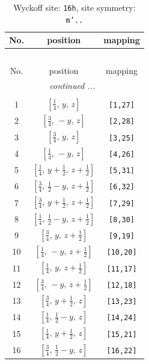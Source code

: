 \documentclass[fleqn,8pt]{jsarticle}
\begin{document}
\renewcommand{\arraystretch}{1.2}
\begin{longtable}{ccc}
\caption{Wyckoff site: {\tt 16h}, site symmetry: {\tt m'..}}
 \\
 \hline \hline
No. & position & mapping \\ \hline \endfirsthead

\multicolumn{2}{l}{\tablename\ \thetable{}} \\
 \hline \hline
No. & position & mapping \\ \hline \endhead

 \hline \hline
\multicolumn{2}{r}{\footnotesize\it continued ...} \\ \endfoot

 \hline \hline
\multicolumn{2}{r}{} \\ \endlastfoot

1 & $\left[ \frac{1}{4},\, y,\, z \right]$ & {\tt [1,27]} \\ \hline
2 & $\left[ \frac{3}{4},\, - y,\, z \right]$ & {\tt [2,28]} \\ \hline
3 & $\left[ \frac{3}{4},\, y,\, z \right]$ & {\tt [3,25]} \\ \hline
4 & $\left[ \frac{1}{4},\, - y,\, z \right]$ & {\tt [4,26]} \\ \hline
5 & $\left[ \frac{1}{4},\, y + \frac{1}{2},\, z + \frac{1}{2} \right]$ & {\tt [5,31]} \\ \hline
6 & $\left[ \frac{3}{4},\, \frac{1}{2} - y,\, z + \frac{1}{2} \right]$ & {\tt [6,32]} \\ \hline
7 & $\left[ \frac{3}{4},\, y + \frac{1}{2},\, z + \frac{1}{2} \right]$ & {\tt [7,29]} \\ \hline
8 & $\left[ \frac{1}{4},\, \frac{1}{2} - y,\, z + \frac{1}{2} \right]$ & {\tt [8,30]} \\ \hline
9 & $\left[ \frac{3}{4},\, y,\, z + \frac{1}{2} \right]$ & {\tt [9,19]} \\ \hline
10 & $\left[ \frac{1}{4},\, - y,\, z + \frac{1}{2} \right]$ & {\tt [10,20]} \\ \hline
11 & $\left[ \frac{1}{4},\, y,\, z + \frac{1}{2} \right]$ & {\tt [11,17]} \\ \hline
12 & $\left[ \frac{3}{4},\, - y,\, z + \frac{1}{2} \right]$ & {\tt [12,18]} \\ \hline
13 & $\left[ \frac{3}{4},\, y + \frac{1}{2},\, z \right]$ & {\tt [13,23]} \\ \hline
14 & $\left[ \frac{1}{4},\, \frac{1}{2} - y,\, z \right]$ & {\tt [14,24]} \\ \hline
15 & $\left[ \frac{1}{4},\, y + \frac{1}{2},\, z \right]$ & {\tt [15,21]} \\ \hline
16 & $\left[ \frac{3}{4},\, \frac{1}{2} - y,\, z \right]$ & {\tt [16,22]} \\
\end{longtable}
\end{document}
